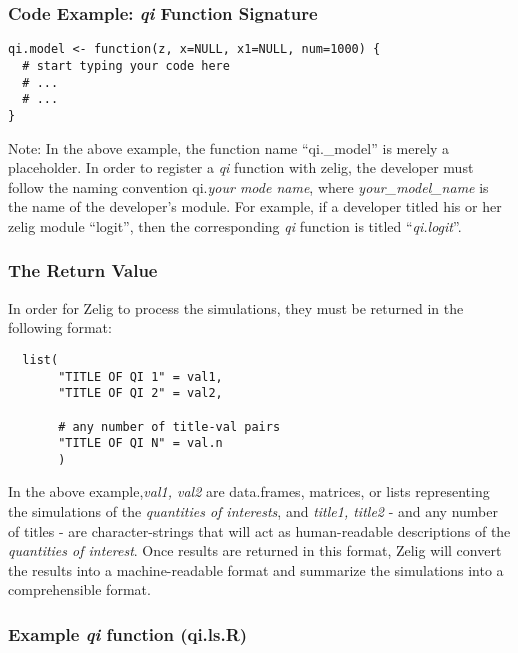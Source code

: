 \subsubsection{Code Example: \emph{qi} Function Signature}
\begin{verbatim}
qi.model <- function(z, x=NULL, x1=NULL, num=1000) {
  # start typing your code here
  # ...
  # ...
}
\end{verbatim}


Note: In the above example, the function name ``qi.\_model'' is merely a placeholder.  In order to register a \emph{qi} function with zelig, the developer must follow the naming convention qi.\emph{your mode name}, where \emph{your\_model\_name} is the name of the developer's module.  For example, if a developer titled his or her zelig module ``logit'', then the corresponding \emph{qi} function is titled ``\emph{qi.logit}''.


\subsubsection{The Return Value}
In order for Zelig to process the simulations, they must be returned in the following format:

\begin{verbatim}
  list(
       "TITLE OF QI 1" = val1,
       "TITLE OF QI 2" = val2,

       # any number of title-val pairs
       "TITLE OF QI N" = val.n
       )
\end{verbatim}


In the above example,\emph{val1, val2} are data.frames, matrices, or lists representing the simulations of the \emph{quantities of interests}, and \emph{title1, title2} - and any number of titles - are character-strings that will act as human-readable descriptions of the \emph{quantities of interest}.  Once results are returned in this format, Zelig will convert the results into a machine-readable format and summarize the simulations into a comprehensible format.




%

\pagebreak

\subsubsection{Example \emph{qi} function (qi.ls.R)}


